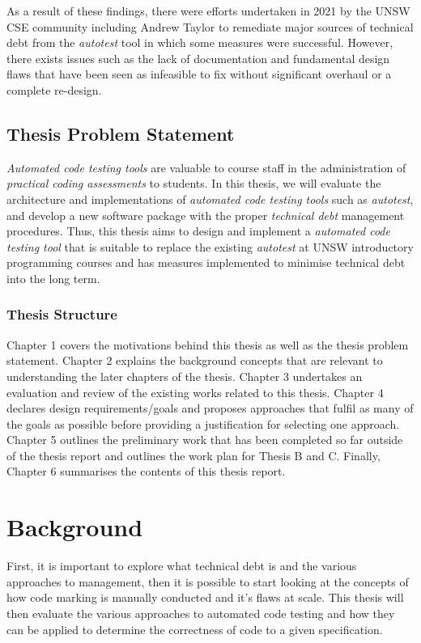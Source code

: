 \documentclass[hidelinks, 12pt]{extreport}
\newcommand{\unchapter}[2]{
    \setcounter{chapter}{#1}
    \setcounter{section}{0}
    \chapter*{#2}
    \addcontentsline{toc}{chapter}{#2}
}
\begin{document}
As a result of these findings, there were efforts undertaken in 2021 by the UNSW CSE community including Andrew Taylor to remediate major sources of technical debt from the \textit{autotest} tool in which some measures were successful. However, there exists issues such as the lack of documentation and fundamental design flaws that have been seen as infeasible to fix without significant overhaul or a complete re-design\cite{AutotestIssues}.

\section{Thesis Problem Statement}
\textit{Automated code testing tools} are valuable to course staff in the administration of \textit{practical coding assessments} to students. In this thesis, we will evaluate the architecture and implementations of \textit{automated code testing tools} such as \textit{autotest}, and develop a new software package with the proper \textit{technical debt} management procedures. Thus, this thesis aims to design and implement a \textit{automated code testing tool} that is suitable to replace the existing \textit{autotest} at UNSW introductory programming courses and has measures implemented to minimise technical debt into the long term.

\subsection{Thesis Structure}

Chapter 1 covers the motivations behind this thesis as well as the thesis problem statement.
Chapter 2 explains the background concepts that are relevant to understanding the later chapters of the thesis. Chapter 3 undertakes an evaluation and review of the existing works related to this thesis.
Chapter 4 declares design requirements/goals and proposes approaches that fulfil as many of the goals as possible before providing a justification for selecting one approach.
Chapter 5 outlines the preliminary work that has been completed so far outside of the thesis report and outlines the work plan for Thesis B and C.
Finally, Chapter 6 summarises the contents of this thesis report.

\unchapter{2}{Background}

First, it is important to explore what technical debt is and the various approaches to management, then it is possible to start looking at the concepts of how code marking is manually conducted and it's flaws at scale. This thesis will then evaluate the various approaches to automated code testing and how they can be applied to determine the correctness of code to a given specification.
\end{document}
